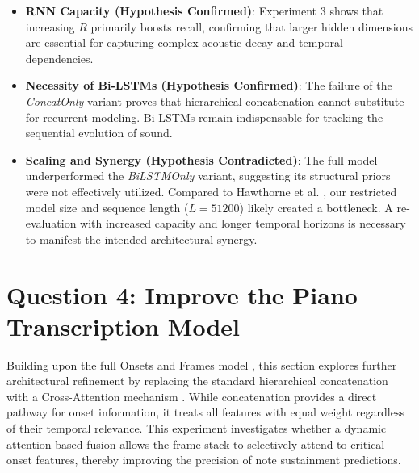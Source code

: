 \documentclass{article}
\begin{document}
\begin{itemize}
    \item \textbf{RNN Capacity (Hypothesis Confirmed)}: Experiment 3 shows that increasing $R$ primarily boosts recall, confirming that larger hidden dimensions are essential for capturing complex acoustic decay and temporal dependencies.

    \item \textbf{Necessity of Bi-LSTMs (Hypothesis Confirmed)}: The failure of the \textit{ConcatOnly} variant proves that hierarchical concatenation cannot substitute for recurrent modeling. Bi-LSTMs remain indispensable for tracking the sequential evolution of sound.

    \item \textbf{Scaling and Synergy (Hypothesis Contradicted)}: The full model underperformed the \textit{BiLSTMOnly} variant, suggesting its structural priors were not effectively utilized. Compared to Hawthorne et al. \cite{hawthorne2018onsetsframesdualobjectivepiano}, our restricted model size and sequence length ($L=51200$) likely created a bottleneck. A re-evaluation with increased capacity and longer temporal horizons is necessary to manifest the intended architectural synergy.
\end{itemize}

\section{Question 4: Improve the Piano Transcription Model}
Building upon the full Onsets and Frames model \cite{hawthorne2018onsetsframesdualobjectivepiano}, this section explores further architectural refinement by replacing the standard hierarchical concatenation with a Cross-Attention mechanism \cite{vaswani2017attention}. While concatenation provides a direct pathway for onset information, it treats all features with equal weight regardless of their temporal relevance. This experiment investigates whether a dynamic attention-based fusion allows the frame stack to selectively attend to critical onset features, thereby improving the precision of note sustainment predictions.
\end{document}

